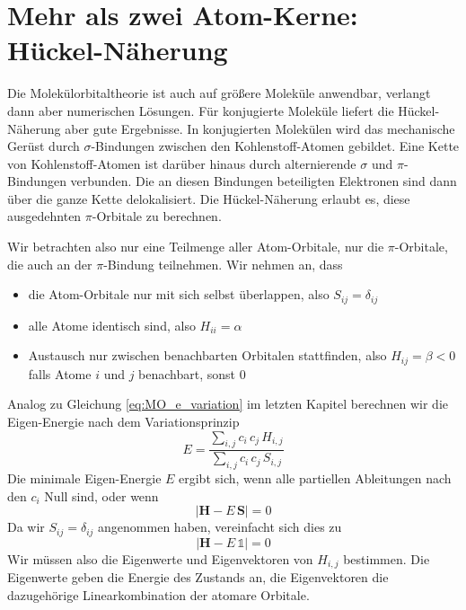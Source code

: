 \newpage
\section{Mehr als zwei Atom-Kerne: Hückel-Näherung}

Die Molekülorbitaltheorie ist auch auf größere Moleküle anwendbar, verlangt dann aber  numerischen Lösungen. Für konjugierte Moleküle liefert die Hückel-Näherung aber gute Ergebnisse. In konjugierten Molekülen wird das mechanische Gerüst durch $\sigma$-Bindungen zwischen den Kohlenstoff-Atomen gebildet. Eine Kette von Kohlenstoff-Atomen ist darüber hinaus durch alternierende $\sigma$ und $\pi$-Bindungen verbunden. Die an diesen Bindungen beteiligten Elektronen sind dann über die ganze Kette delokalisiert. Die Hückel-Näherung erlaubt es, diese ausgedehnten  $\pi$-Orbitale  zu berechnen.

Wir betrachten also nur eine Teilmenge aller Atom-Orbitale, nur die $\pi$-Orbitale, die auch an der $\pi$-Bindung teilnehmen. Wir nehmen an, dass
\begin{itemize} \setlength{\itemsep}{0pt}
\item die Atom-Orbitale nur mit sich selbst überlappen, also $S_{ij} = \delta_{ij}$
\item alle Atome identisch sind, also $H_{ii} = \alpha$
\item Austausch nur zwischen benachbarten Orbitalen stattfinden, also  $H_{ij} = \beta < 0 $ falls Atome $i$ und $j$ benachbart, sonst $0$ 
\end{itemize}

Analog zu Gleichung \ref{eq:MO_e_variation} im letzten Kapitel berechnen wir die Eigen-Energie nach dem Variationsprinzip
\begin{equation}
 E = \frac{  \sum_{i,j} c_i \, c_j \, H_{i,j} }{ \sum_{i,j} c_i \, c_j \, S_{i,j} }
\end{equation}
Die minimale Eigen-Energie $E$ ergibt sich, wenn alle partiellen Ableitungen nach den $c_i$ Null sind, oder wenn
\begin{equation}
 \left| \mathbf{H} - E \, \mathbf{S}\right| = 0
\end{equation}
Da wir $S_{ij} = \delta_{ij}$ angenommen haben, vereinfacht sich dies zu 
\begin{equation}
 \left| \mathbf{H} - E \, \mathds{1} \right| = 0
\end{equation}
Wir müssen also die Eigenwerte und Eigenvektoren von $H_{i,j}$ bestimmen. Die Eigenwerte geben die Energie des Zustands an, die Eigenvektoren die dazugehörige  Linearkombination der atomare Orbitale.


